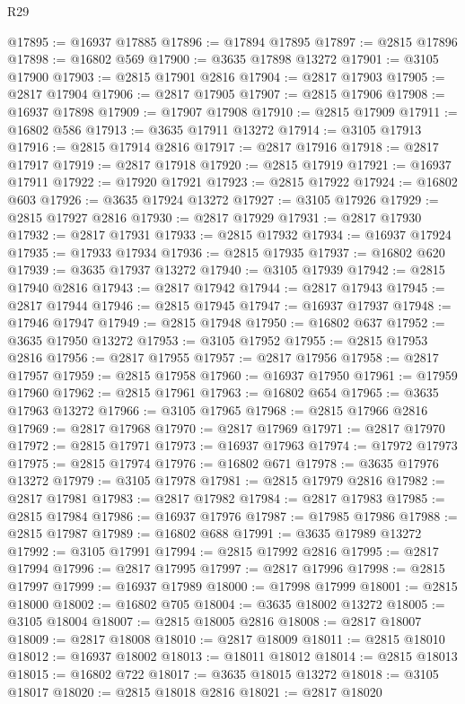 \begin{lexlean}{R29}
\begin{coremodule}
@17895 := @16937 @17885
@17896 := @17894 @17895
@17897 := @2815 @17896
@17898 := @16802 @569
@17900 := @3635 @17898 @13272
@17901 := @3105 @17900
@17903 := @2815 @17901 @2816
@17904 := @2817 @17903
@17905 := @2817 @17904
@17906 := @2817 @17905
@17907 := @2815 @17906
@17908 := @16937 @17898
@17909 := @17907 @17908
@17910 := @2815 @17909
@17911 := @16802 @586
@17913 := @3635 @17911 @13272
@17914 := @3105 @17913
@17916 := @2815 @17914 @2816
@17917 := @2817 @17916
@17918 := @2817 @17917
@17919 := @2817 @17918
@17920 := @2815 @17919
@17921 := @16937 @17911
@17922 := @17920 @17921
@17923 := @2815 @17922
@17924 := @16802 @603
@17926 := @3635 @17924 @13272
@17927 := @3105 @17926
@17929 := @2815 @17927 @2816
@17930 := @2817 @17929
@17931 := @2817 @17930
@17932 := @2817 @17931
@17933 := @2815 @17932
@17934 := @16937 @17924
@17935 := @17933 @17934
@17936 := @2815 @17935
@17937 := @16802 @620
@17939 := @3635 @17937 @13272
@17940 := @3105 @17939
@17942 := @2815 @17940 @2816
@17943 := @2817 @17942
@17944 := @2817 @17943
@17945 := @2817 @17944
@17946 := @2815 @17945
@17947 := @16937 @17937
@17948 := @17946 @17947
@17949 := @2815 @17948
@17950 := @16802 @637
@17952 := @3635 @17950 @13272
@17953 := @3105 @17952
@17955 := @2815 @17953 @2816
@17956 := @2817 @17955
@17957 := @2817 @17956
@17958 := @2817 @17957
@17959 := @2815 @17958
@17960 := @16937 @17950
@17961 := @17959 @17960
@17962 := @2815 @17961
@17963 := @16802 @654
@17965 := @3635 @17963 @13272
@17966 := @3105 @17965
@17968 := @2815 @17966 @2816
@17969 := @2817 @17968
@17970 := @2817 @17969
@17971 := @2817 @17970
@17972 := @2815 @17971
@17973 := @16937 @17963
@17974 := @17972 @17973
@17975 := @2815 @17974
@17976 := @16802 @671
@17978 := @3635 @17976 @13272
@17979 := @3105 @17978
@17981 := @2815 @17979 @2816
@17982 := @2817 @17981
@17983 := @2817 @17982
@17984 := @2817 @17983
@17985 := @2815 @17984
@17986 := @16937 @17976
@17987 := @17985 @17986
@17988 := @2815 @17987
@17989 := @16802 @688
@17991 := @3635 @17989 @13272
@17992 := @3105 @17991
@17994 := @2815 @17992 @2816
@17995 := @2817 @17994
@17996 := @2817 @17995
@17997 := @2817 @17996
@17998 := @2815 @17997
@17999 := @16937 @17989
@18000 := @17998 @17999
@18001 := @2815 @18000
@18002 := @16802 @705
@18004 := @3635 @18002 @13272
@18005 := @3105 @18004
@18007 := @2815 @18005 @2816
@18008 := @2817 @18007
@18009 := @2817 @18008
@18010 := @2817 @18009
@18011 := @2815 @18010
@18012 := @16937 @18002
@18013 := @18011 @18012
@18014 := @2815 @18013
@18015 := @16802 @722
@18017 := @3635 @18015 @13272
@18018 := @3105 @18017
@18020 := @2815 @18018 @2816
@18021 := @2817 @18020

\end{coremodule}
\end{lexlean}
